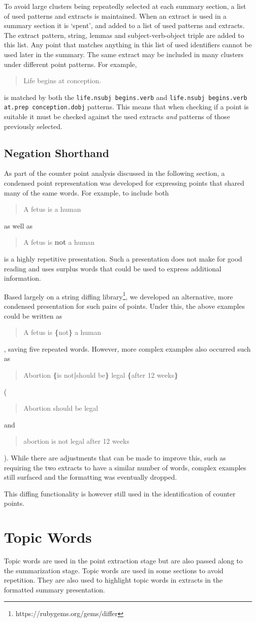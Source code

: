     To avoid large clusters being repeatedly selected at each summary section, a list of used patterns and extracts is maintained. When an extract is used in a summary section it is `spent', and added to a list of used patterns and extracts. The extract pattern, string, lemmas and subject-verb-object triple are added to this list. Any point that matches anything in this list of used identifiers cannot be used later in the summary. The same extract may be included in many clusters under different point patterns. For example, \blockquote{Life begins at conception.} is matched by both the \texttt{life.nsubj begins.verb} and \texttt{life.nsubj begins.verb at.prep conception.dobj} patterns. This means that when checking if a point is suitable it must be checked against the used extracts \textit{and} patterns of those previously selected.

    \tocless\subsection{Negation Shorthand}
      As part of the counter point analysis discussed in the following section, a condensed point representation was developed for expressing points that shared many of the same words. For example, to include both \blockquote{A fetus is a human} as well as \blockquote{A fetus is \textbf{not} a human} is a highly repetitive presentation. Such a presentation does not make for good reading and uses surplus words that could be used to express additional information.

      Based largely on a string diffing library\footnote{https://rubygems.org/gems/differ}, we developed an alternative, more condensed presentation for such pairs of points. Under this, the above examples could be written as \blockquote{A fetus is \textbf{\{}not\textbf{\}} a human}, saving five repeated words. However, more complex examples also occurred such as \blockquote{Abortion \textbf{\{}is not\textbf{|}should be\textbf{\}} legal \textbf{\{}after 12 weeks\textbf{\}}} (\blockquote{Abortion should be legal} and \blockquote{abortion is not legal after 12 weeks}). While there are adjustments that can be made to improve this, such as requiring the two extracts to have a similar number of words, complex examples still surfaced and the formatting was eventually dropped.

      This diffing functionality is however still used in the identification of counter points.

  \section{Topic Words}
    Topic words are used in the point extraction stage but are also passed along to the summarization stage. Topic words are used in some sections to avoid repetition. They are also used to highlight topic words in extracts in the formatted summary presentation.

